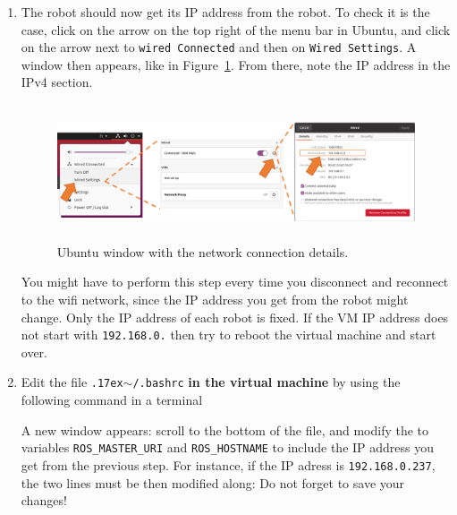 \documentclass[10pt,a4paper,printanswers]{upmc}
\newcommand{\mytilde}{\raise.17ex\hbox{$\scriptstyle\mathtt{\sim}$}}
\begin{document}
\begin{enumerate}
  \item The robot should now get its IP address from the robot. To check it is the case, click on
        the arrow on the top right of the menu bar in Ubuntu, and click on the arrow next to
        \texttt{wired Connected} and then on \texttt{Wired Settings}. A window then appears, like in
        Figure~\ref{fig:wifi}. From there, note the IP address in the IPv4 section.
        \begin{figure}[!h]
          \centering\includegraphics[height=4cm]{figures/wifi.png}
          \caption{Ubuntu window with the network connection details.}
          \label{fig:wifi}
        \end{figure}
        \begin{mdframed}[style=graybox]
          You might have to perform this step every time you disconnect and reconnect to the wifi
          network, since the IP address you get from the robot might change. Only the IP address of
          each robot is fixed. If the VM IP address does not start with \texttt{192.168.0.} then try
          to reboot the virtual machine and start over.
        \end{mdframed}

  \item Edit the file \texttt{\mytilde/.bashrc} \textbf{in the virtual machine }by using the
        following command in a terminal
        
        A new window appears: scroll to the bottom of the file, and modify the to variables
        \texttt{ROS\_MASTER\_URI} and \texttt{ROS\_HOSTNAME} to include the IP address you get from
        the previous step. For instance, if the IP adress is \texttt{192.168.0.237}, the two lines
        must be then modified along: 
        Do not forget to save your changes!


\end{enumerate}
\end{document}
